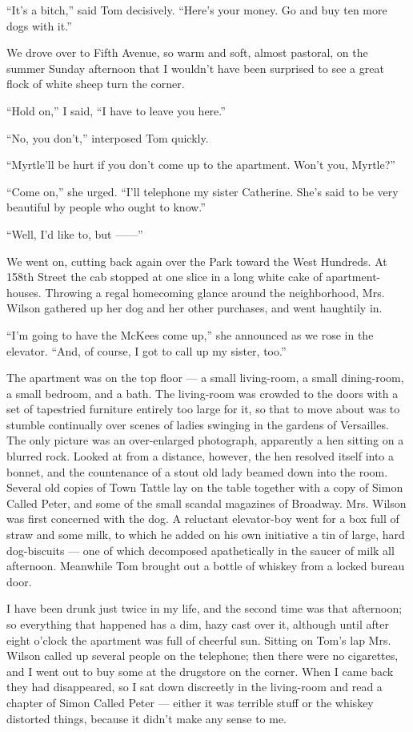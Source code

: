\documentclass{znotebook}
\begin{document}
``It’s a bitch,'' said Tom decisively. ``Here’s your money. Go and buy ten more dogs with it.''

We drove over to Fifth Avenue, so warm and soft, almost pastoral, on the summer Sunday afternoon that I wouldn’t have been surprised to see a great flock of white sheep turn the corner.

``Hold on,'' I said, ``I have to leave you here.''

``No, you don’t,'' interposed Tom quickly.

``Myrtle’ll be hurt if you don’t come up to the apartment. Won’t you, Myrtle?''

``Come on,'' she urged. ``I’ll telephone my sister Catherine. She’s said to be very beautiful by people who ought to know.''

``Well, I’d like to, but ——''

We went on, cutting back again over the Park toward the West Hundreds. At 158th Street the cab stopped at one slice in a long white cake of apartment-houses. Throwing a regal homecoming glance around the neighborhood, Mrs. Wilson gathered up her dog and her other purchases, and went haughtily in.

``I’m going to have the McKees come up,'' she announced as we rose in the elevator. ``And, of course, I got to call up my sister, too.''

The apartment was on the top floor — a small living-room, a small dining-room, a small bedroom, and a bath. The living-room was crowded to the doors with a set of tapestried furniture entirely too large for it, so that to move about was to stumble continually over scenes of ladies swinging in the gardens of Versailles. The only picture was an over-enlarged photograph, apparently a hen sitting on a blurred rock. Looked at from a distance, however, the hen resolved itself into a bonnet, and the countenance of a stout old lady beamed down into the room. Several old copies of Town Tattle lay on the table together with a copy of Simon Called Peter, and some of the small scandal magazines of Broadway. Mrs. Wilson was first concerned with the dog. A reluctant elevator-boy went for a box full of straw and some milk, to which he added on his own initiative a tin of large, hard dog-biscuits — one of which decomposed apathetically in the saucer of milk all afternoon. Meanwhile Tom brought out a bottle of whiskey from a locked bureau door.

I have been drunk just twice in my life, and the second time was that afternoon; so everything that happened has a dim, hazy cast over it, although until after eight o’clock the apartment was full of cheerful sun. Sitting on Tom’s lap Mrs. Wilson called up several people on the telephone; then there were no cigarettes, and I went out to buy some at the drugstore on the corner. When I came back they had disappeared, so I sat down discreetly in the living-room and read a chapter of Simon Called Peter — either it was terrible stuff or the whiskey distorted things, because it didn’t make any sense to me.
\end{document}
